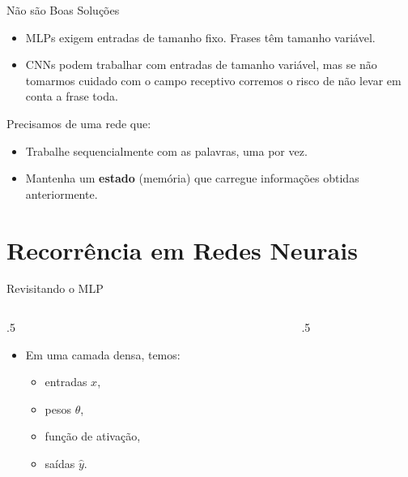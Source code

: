 \documentclass[aspectratio=169,xcolor=dvipsnames]{beamer}
\begin{document}
\begin{frame}{Não são Boas Soluções}
\begin{itemize}
    \item MLPs exigem entradas de tamanho fixo. Frases têm tamanho variável.
    \item CNNs podem trabalhar com entradas de tamanho variável, mas se não tomarmos cuidado com o campo receptivo corremos o risco de não levar em conta a frase toda.
\end{itemize}
\vspace{0.4em}
Precisamos de uma rede que:
\begin{itemize}
    \item Trabalhe sequencialmente com as palavras, uma por vez.
    \item Mantenha um \textbf{estado} (memória) que carregue informações obtidas anteriormente.
\end{itemize}
\end{frame}

\section{Recorrência em Redes Neurais}

\begin{frame}{Revisitando o MLP}
\begin{columns}
    \begin{column}{.5\linewidth}
        \begin{itemize}
            \item Em uma camada densa, temos:
            \begin{itemize}
                \item entradas $x$,
                \item pesos $\theta$,
                \item função de ativação,
                \item saídas $\hat{y}$.
            \end{itemize}
        \end{itemize}
    \end{column}
    \begin{column}{.5\linewidth}
        \centering
    \end{column}
\end{columns}
\end{frame}
\end{document}
